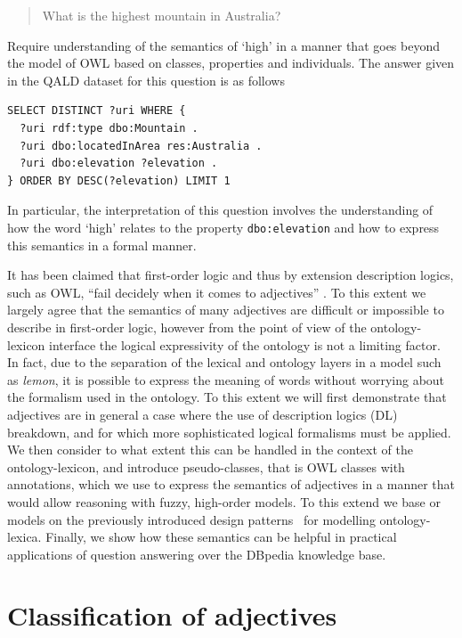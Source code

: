\documentclass[11pt]{article}
\begin{document}
\begin{quote}
What is the highest mountain in Australia?
\end{quote}

Require understanding of the semantics of `high' in a manner that goes beyond 
the model of OWL based on classes, properties and individuals. The answer given 
in the QALD dataset for this question is as follows

\begin{verbatim}
SELECT DISTINCT ?uri WHERE { 
  ?uri rdf:type dbo:Mountain . 
  ?uri dbo:locatedInArea res:Australia . 
  ?uri dbo:elevation ?elevation . 
} ORDER BY DESC(?elevation) LIMIT 1
\end{verbatim}

In particular, the interpretation of this question involves the understanding of 
how the word `high' relates to the property {\tt dbo:elevation} and how to 
express this semantics in a formal manner.

It has been claimed that first-order logic and thus by extension description 
logics, such as OWL, ``fail decidely when it comes to adjectives''
\cite{bankston2003modeling}. To this extent we largely agree that the semantics 
of many adjectives are difficult or impossible to describe in first-order logic, 
however from the point of view of the ontology-lexicon interface the logical 
expressivity of the ontology is not a limiting factor. In fact, due to the 
separation of the lexical and ontology layers in a model such as \emph{lemon}, 
it is possible to express the meaning of words without worrying about the 
formalism used in the ontology. To this extent we will first demonstrate that 
adjectives are in general a case where the use of description logics (DL) breakdown, 
and for which more sophisticated logical formalisms must be applied. We then 
consider to what extent this can be handled in the context of the 
ontology-lexicon, and introduce pseudo-classes, that is OWL classes with 
annotations, which we use to express the semantics of adjectives in a manner
that would allow reasoning with fuzzy, high-order models. To this extend we base
or models on the previously introduced design patterns~\cite{mccrae2014design}
for modelling ontology-lexica. 
Finally, we show how these semantics can be helpful in practical applications 
of question answering over the DBpedia knowledge base.

\section{Classification of adjectives}
\end{document}
